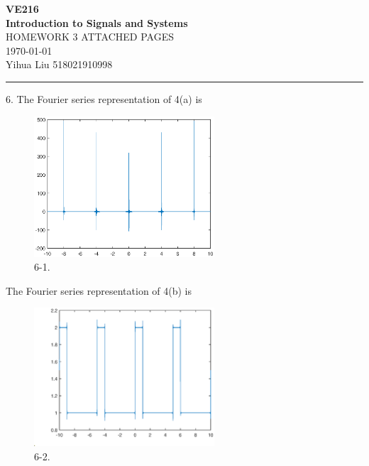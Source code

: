 \documentclass[a4paper]{article}
\begin{document}
\begin{center}
\huge
\textbf{VE216\\Introduction to Signals and Systems\\}
\Large
\vspace{30pt}
\uppercase{Homework 3 Attached Pages}\\
\vspace{5pt}\today\\
\vspace{5pt}
Yihua Liu 518021910998
\vspace{5pt}
\rule[-10pt]{.97\linewidth}{0.05em}
\end{center}

6. The Fourier series representation of 4(a) is
\begin{figure}[H]
    \begin{center}
        \includegraphics[width=0.6\textwidth]{6-1.eps}
    \end{center}
    \caption{6-1.}
\end{figure}

The Fourier series representation of 4(b) is
\begin{figure}[H]
    \begin{center}
        \includegraphics[width=0.6\textwidth]{6-2.eps}
    \end{center}
    \caption{6-2.}
\end{figure}
\end{document}
